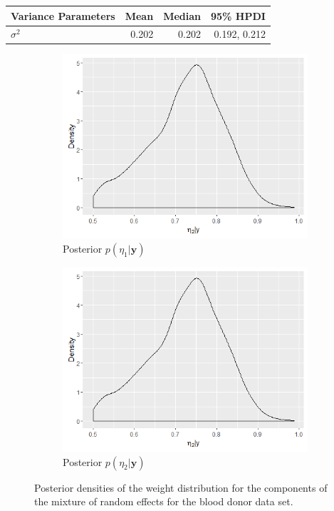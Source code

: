 \begin{table}[!htb]
\begin{tabular}{@{}lrrr@{}}
\toprule
Variance Parameters & Mean & Median & 95\% HPDI \\ \midrule
$\sigma^2$ & 0.202 & 0.202 & 0.192, 0.212\\ \bottomrule
\end{tabular}

\end{table}

\begin{figure}[!htb]
\centering
\captionsetup{justification=centering}
\begin{subfigure}[b]{0.4\textwidth}
		\includegraphics[width=\textwidth]{mainmatter/chapter_6_blood_donor/eta1.png}
        \caption{\label{fig : eta_blood_donor_1} Posterior $p(\eta_1|\boldsymbol{y})$}
	\end{subfigure}
	\begin{subfigure}[b]{0.4\textwidth}
		\includegraphics[width=\textwidth]{mainmatter/chapter_6_blood_donor/eta2.png}	
          \caption{\label{fig : eta_blood_donor_2}Posterior $p(\eta_2|\boldsymbol{y})$}
	\end{subfigure}	
	\caption{Posterior densities of the weight distribution for the components of the mixture of random effects for the blood donor data set.}
	\label{fig : eta_blood_donor}    
\end{figure} 

